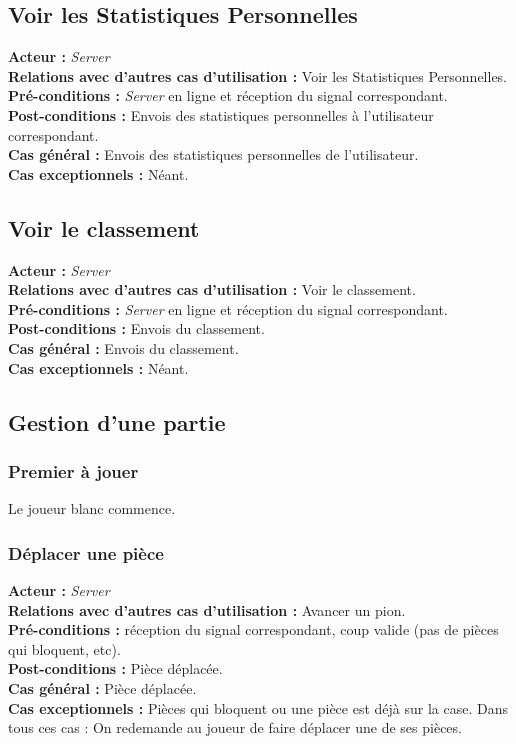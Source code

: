 \documentclass[10pt, a4paper]{article}
\begin{document}
\subsection{Voir les Statistiques Personnelles}
\textbf{Acteur :} \textit{Server} \\
\textbf{Relations avec d'autres cas d'utilisation :} Voir les Statistiques Personnelles. \\
\textbf{Pré-conditions :} \textit{Server} en ligne et réception du signal correspondant. \\
\textbf{Post-conditions :} Envois des statistiques personnelles à l'utilisateur correspondant. \\
\textbf{Cas général :} Envois des statistiques personnelles de l'utilisateur. \\
\textbf{Cas exceptionnels :} Néant. \\

\subsection{Voir le classement}
\textbf{Acteur :} \textit{Server} \\
\textbf{Relations avec d'autres cas d'utilisation :} Voir le classement. \\
\textbf{Pré-conditions :} \textit{Server} en ligne et réception du signal correspondant. \\
\textbf{Post-conditions :} Envois du classement. \\
\textbf{Cas général :} Envois du classement. \\
\textbf{Cas exceptionnels :} Néant. \\

\subsection{Gestion d'une partie}

\subsubsection{Premier à jouer}
Le joueur blanc commence.

\subsubsection{Déplacer une pièce}
\textbf{Acteur :} \textit{Server} \\
\textbf{Relations avec d'autres cas d'utilisation :} Avancer un pion. \\
\textbf{Pré-conditions :} réception du signal correspondant, coup valide (pas de pièces qui bloquent, etc). \\
\textbf{Post-conditions :} Pièce déplacée. \\
\textbf{Cas général :} Pièce déplacée. \\
\textbf{Cas exceptionnels :} Pièces qui bloquent ou une pièce est déjà sur la case. Dans tous ces cas : On redemande au joueur de faire déplacer une de ses pièces. \\
\end{document}
